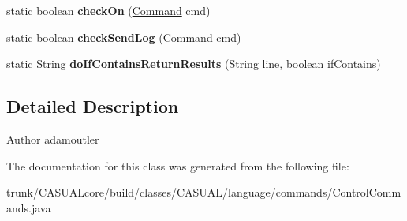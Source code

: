 \begin{DoxyCompactItemize}
\item 
\hypertarget{class_c_a_s_u_a_l_1_1language_1_1commands_1_1_control_commands_a4f1d4f580d31c53006c30ab5d01d85fd}{static boolean {\bfseries check\-On} (\hyperlink{class_c_a_s_u_a_l_1_1language_1_1_command}{Command} cmd)}\label{class_c_a_s_u_a_l_1_1language_1_1commands_1_1_control_commands_a4f1d4f580d31c53006c30ab5d01d85fd}

\item 
\hypertarget{class_c_a_s_u_a_l_1_1language_1_1commands_1_1_control_commands_a569476656b70ebd38e34a4bee70a7a86}{static boolean {\bfseries check\-Send\-Log} (\hyperlink{class_c_a_s_u_a_l_1_1language_1_1_command}{Command} cmd)}\label{class_c_a_s_u_a_l_1_1language_1_1commands_1_1_control_commands_a569476656b70ebd38e34a4bee70a7a86}

\item 
\hypertarget{class_c_a_s_u_a_l_1_1language_1_1commands_1_1_control_commands_a821c994818e421590f1e69f8e25d0c87}{static String {\bfseries do\-If\-Contains\-Return\-Results} (String line, boolean if\-Contains)}\label{class_c_a_s_u_a_l_1_1language_1_1commands_1_1_control_commands_a821c994818e421590f1e69f8e25d0c87}

\end{DoxyCompactItemize}


\subsection{Detailed Description}
\begin{DoxyAuthor}{Author}
adamoutler 
\end{DoxyAuthor}


The documentation for this class was generated from the following file\-:\begin{DoxyCompactItemize}
\item 
trunk/\-C\-A\-S\-U\-A\-Lcore/build/classes/\-C\-A\-S\-U\-A\-L/language/commands/Control\-Commands.\-java\end{DoxyCompactItemize}
